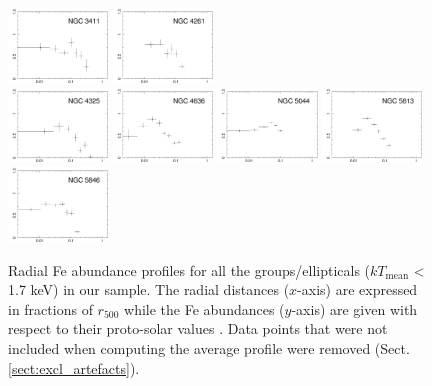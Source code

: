 \documentclass{aa}
\begin{document}
\begin{figure}[!]
                \includegraphics[width=0.236\textwidth,trim={0 0 0 0},clip]{fig_NGC3411_Fe.pdf}
                \includegraphics[width=0.236\textwidth,trim={0 0 0 0},clip]{fig_NGC4261_Fe.pdf} \\
                \includegraphics[width=0.236\textwidth,trim={0 0 0 0},clip]{fig_NGC4325_Fe.pdf}
                \includegraphics[width=0.236\textwidth,trim={0 0 0 0},clip]{fig_NGC4636_Fe.pdf}
                \includegraphics[width=0.236\textwidth,trim={0 0 0 0},clip]{fig_NGC5044_Fe.pdf}
                \includegraphics[width=0.236\textwidth,trim={0 0 0 0},clip]{fig_NGC5813_Fe.pdf} \\
                \includegraphics[width=0.236\textwidth,trim={0 0 0 0},clip]{fig_NGC5846_Fe.pdf}


        \caption{Radial Fe abundance profiles for all the groups/ellipticals ($kT_\text{mean}$ < 1.7 keV) in our sample. The radial distances ($x$-axis) are expressed in fractions of $r_{500}$ while the Fe abundances ($y$-axis) are given with respect to their proto-solar values \citep{2009LanB...4B...44L}. Data points that were not included when computing the average profile were removed (Sect. \ref{sect:excl_artefacts}). 
}
\label{fig:Fe_profiles_indiv_groups}
\end{figure}
\end{document}
